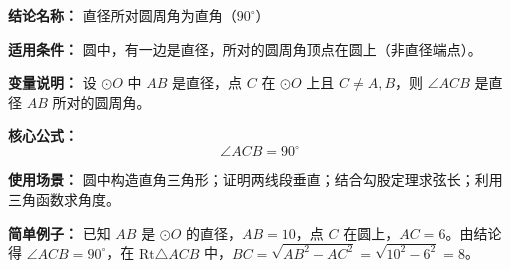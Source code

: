 \textbf{结论名称：} 直径所对圆周角为直角（\(90^\circ\)）

\textbf{适用条件：} 圆中，有一边是直径，所对的圆周角顶点在圆上（非直径端点）。

\textbf{变量说明：} 设 \(\odot O\) 中 \(AB\) 是直径，点 \(C\) 在 \(\odot O\) 上且 \(C\neq A,B\)，则 \(\angle ACB\) 是直径 \(AB\) 所对的圆周角。

\textbf{核心公式：}
\[
\boxed{\angle ACB = 90^\circ}
\]

\textbf{使用场景：} 圆中构造直角三角形；证明两线段垂直；结合勾股定理求弦长；利用三角函数求角度。

\textbf{简单例子：} 已知 \(AB\) 是 \(\odot O\) 的直径，\(AB=10\)，点 \(C\) 在圆上，\(AC=6\)。由结论得 \(\angle ACB=90^\circ\)，在 \(\text{Rt}\triangle ACB\) 中，\(BC=\sqrt{AB^{2}-AC^{2}}=\sqrt{10^{2}-6^{2}}=8\)。